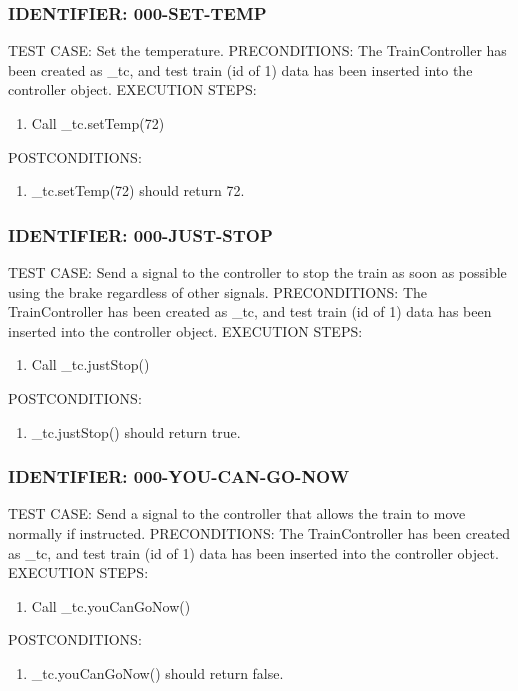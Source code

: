 \documentclass{scrreprt}
\begin{document}
\subsubsection{IDENTIFIER: 000-SET-TEMP}
TEST CASE: Set the temperature.
PRECONDITIONS: The TrainController has been created as _tc, and test train (id of 1) data has been inserted into the controller object.
EXECUTION STEPS:
\begin{enumerate}
	\item Call _tc.setTemp(72)
\end{enumerate}
POSTCONDITIONS:
\begin{enumerate}
	\item _tc.setTemp(72) should return 72.
\end{enumerate}

\subsubsection{IDENTIFIER: 000-JUST-STOP}
TEST CASE: Send a signal to the controller to stop the train as soon as possible using the brake regardless of other signals.
PRECONDITIONS: The TrainController has been created as _tc, and test train (id of 1) data has been inserted into the controller object.
EXECUTION STEPS:
\begin{enumerate}
	\item Call _tc.justStop()
\end{enumerate}
POSTCONDITIONS:
\begin{enumerate}
	\item _tc.justStop() should return true.
\end{enumerate}

\subsubsection{IDENTIFIER: 000-YOU-CAN-GO-NOW}
TEST CASE: Send a signal to the controller that allows the train to move normally if instructed.
PRECONDITIONS: The TrainController has been created as _tc, and test train (id of 1) data has been inserted into the controller object.
EXECUTION STEPS:
\begin{enumerate}
	\item Call _tc.youCanGoNow()
\end{enumerate}
POSTCONDITIONS:
\begin{enumerate}
	\item _tc.youCanGoNow() should return false.
\end{enumerate}
\end{document}
